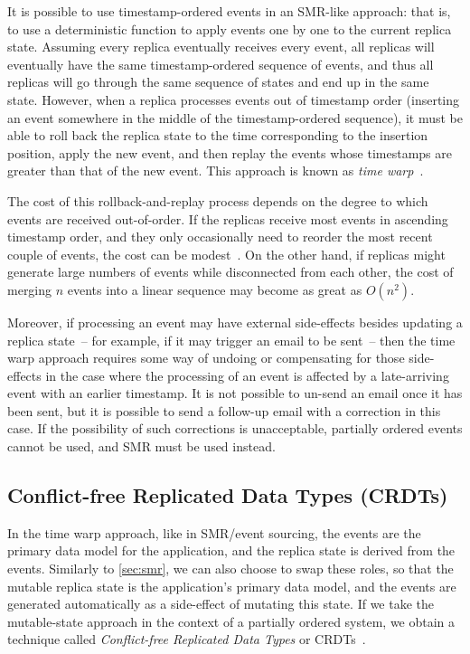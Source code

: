 \documentclass[sigconf,nonacm]{acmart}
\begin{document}
It is possible to use timestamp-ordered events in an SMR-like approach: that is, to use a deterministic function to apply events one by one to the current replica state.
Assuming every replica eventually receives every event, all replicas will eventually have the same timestamp-ordered sequence of events, and thus all replicas will go through the same sequence of states and end up in the same state.
However, when a replica processes events out of timestamp order (inserting an event somewhere in the middle of the timestamp-ordered sequence), it must be able to roll back the replica state to the time corresponding to the insertion position, apply the new event, and then replay the events whose timestamps are greater than that of the new event.
This approach is known as \emph{time warp}~\cite{Jefferson:1985}.

The cost of this rollback-and-replay process depends on the degree to which events are received out-of-order.
If the replicas receive most events in ascending timestamp order, and they only occasionally need to reorder the most recent couple of events, the cost can be modest~\cite{Kuhn:2021}.
On the other hand, if replicas might generate large numbers of events while disconnected from each other, the cost of merging $n$ events into a linear sequence may become as great as $O(n^2)$.

Moreover, if processing an event may have external side-effects besides updating a replica state~-- for example, if it may trigger an email to be sent~-- then the time warp approach requires some way of undoing or compensating for those side-effects in the case where the processing of an event is affected by a late-arriving event with an earlier timestamp.
It is not possible to un-send an email once it has been sent, but it is possible to send a follow-up email with a correction in this case.
If the possibility of such corrections is unacceptable, partially ordered events cannot be used, and SMR must be used instead.

\subsection{Conflict-free Replicated Data Types (CRDTs)}\label{sec:crdts}

In the time warp approach, like in SMR/event sourcing, the events are the primary data model for the application, and the replica state is derived from the events.
Similarly to \autoref{sec:smr}, we can also choose to swap these roles, so that the mutable replica state is the application's primary data model, and the events are generated automatically as a side-effect of mutating this state.
If we take the mutable-state approach in the context of a partially ordered system, we obtain a technique called \emph{Conflict-free Replicated Data Types} or CRDTs~\cite{Shapiro:2011}.
\end{document}
